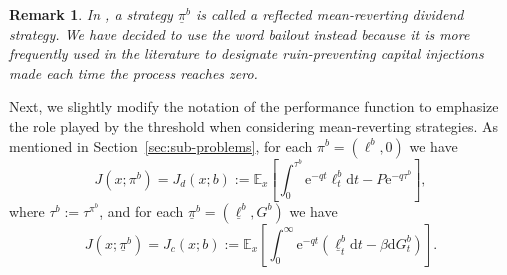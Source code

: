 \documentclass[11pt,reqno]{amsart}
\newtheorem{remark}[theorem]{Remark}
\newcommand{\E}{\mathbb{E}}
\newcommand{\e}{\mathrm{e}}
\newcommand{\diff}{\mathrm{d}}
\begin{document}
\begin{remark}
    In \cite{renaud-et-al_2023}, a strategy $\underline{\pi}^b$ is called a \textit{reflected mean-reverting dividend strategy}. We have decided to use the word \textit{bailout} instead because it is more frequently used in the literature to designate ruin-preventing capital injections made each time the process reaches zero.
\end{remark}

Next, we slightly modify the notation of the performance function to emphasize the role played by the threshold when considering mean-reverting strategies. As mentioned in Section~\ref{sec:sub-problems}, for each $\pi^b = (\ell^b, 0)$ we have
\begin{equation}
    J(x;\pi^b) = J_d(x; b) := \E_x\left[\int_0^{\tau^b} \e^{-qt} \ell^b_t \diff t - P \e^{-q\tau^b} \right] ,
\end{equation}
where $\tau^b := \tau^{\pi^b}$, and for each $\underline \pi^b = (\underline \ell^b, G^b)$ we have
\begin{equation}
    J(x;\underline \pi^b) = J_c(x; b) := \E_x\left[\int_0^\infty \e^{-qt} \left( \underline \ell^b_t \diff t - \beta \diff G^b_t\right)\right] .
\end{equation}
\end{document}
